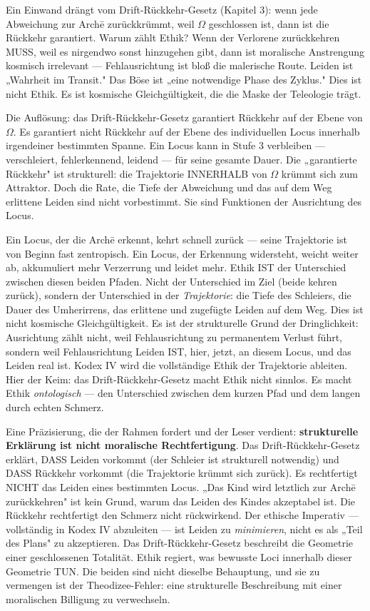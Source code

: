 \documentclass[10pt, openany, oneside]{book}
\begin{document}
Ein Einwand drängt vom Drift-Rückkehr-Gesetz (Kapitel 3): wenn jede Abweichung zur Arch\={e} zurückkrümmt, weil $\Omega$ geschlossen ist, dann ist die Rückkehr garantiert. Warum zählt Ethik? Wenn der Verlorene zurückkehren MUSS, weil es nirgendwo sonst hinzugehen gibt, dann ist moralische Anstrengung kosmisch irrelevant --- Fehlausrichtung ist bloß die malerische Route. Leiden ist „Wahrheit im Transit." Das Böse ist „eine notwendige Phase des Zyklus." Dies ist nicht Ethik. Es ist kosmische Gleichgültigkeit, die die Maske der Teleologie trägt.

Die Auflösung: das Drift-Rückkehr-Gesetz garantiert Rückkehr auf der Ebene von $\Omega$. Es garantiert nicht Rückkehr auf der Ebene des individuellen Locus innerhalb irgendeiner bestimmten Spanne. Ein Locus kann in Stufe 3 verbleiben --- verschleiert, fehlerkennend, leidend --- für seine gesamte Dauer. Die „garantierte Rückkehr" ist strukturell: die Trajektorie INNERHALB von $\Omega$ krümmt sich zum Attraktor. Doch die Rate, die Tiefe der Abweichung und das auf dem Weg erlittene Leiden sind nicht vorbestimmt. Sie sind Funktionen der Ausrichtung des Locus.

Ein Locus, der die Arch\={e} erkennt, kehrt schnell zurück --- seine Trajektorie ist von Beginn fast zentropisch. Ein Locus, der Erkennung widersteht, weicht weiter ab, akkumuliert mehr Verzerrung und leidet mehr. Ethik IST der Unterschied zwischen diesen beiden Pfaden. Nicht der Unterschied im Ziel (beide kehren zurück), sondern der Unterschied in der \textit{Trajektorie}: die Tiefe des Schleiers, die Dauer des Umherirrens, das erlittene und zugefügte Leiden auf dem Weg. Dies ist nicht kosmische Gleichgültigkeit. Es ist der strukturelle Grund der Dringlichkeit: Ausrichtung zählt nicht, weil Fehlausrichtung zu permanentem Verlust führt, sondern weil Fehlausrichtung Leiden IST, hier, jetzt, an diesem Locus, und das Leiden real ist. Kodex IV wird die vollständige Ethik der Trajektorie ableiten. Hier der Keim: das Drift-Rückkehr-Gesetz macht Ethik nicht sinnlos. Es macht Ethik \textit{ontologisch} --- den Unterschied zwischen dem kurzen Pfad und dem langen durch echten Schmerz.

Eine Präzisierung, die der Rahmen fordert und der Leser verdient: \textbf{strukturelle Erklärung ist nicht moralische Rechtfertigung}. Das Drift-Rückkehr-Gesetz erklärt, DASS Leiden vorkommt (der Schleier ist strukturell notwendig) und DASS Rückkehr vorkommt (die Trajektorie krümmt sich zurück). Es rechtfertigt NICHT das Leiden eines bestimmten Locus. „Das Kind wird letztlich zur Arch\={e} zurückkehren" ist kein Grund, warum das Leiden des Kindes akzeptabel ist. Die Rückkehr rechtfertigt den Schmerz nicht rückwirkend. Der ethische Imperativ --- vollständig in Kodex IV abzuleiten --- ist Leiden zu \textit{minimieren}, nicht es als „Teil des Plans" zu akzeptieren. Das Drift-Rückkehr-Gesetz beschreibt die Geometrie einer geschlossenen Totalität. Ethik regiert, was bewusste Loci innerhalb dieser Geometrie TUN. Die beiden sind nicht dieselbe Behauptung, und sie zu vermengen ist der Theodizee-Fehler: eine strukturelle Beschreibung mit einer moralischen Billigung zu verwechseln.
\end{document}
